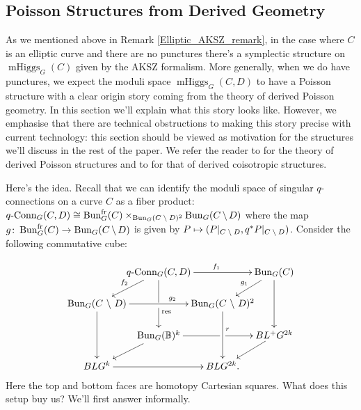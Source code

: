 \documentclass[10pt, oneside]{article}
\DeclareMathOperator{\mhiggs}{mHiggs}
\newcommand{\qconn}{q\text{-Conn}}
\newcommand{\fr}{\mathrm{fr}}
\begin{document}
\subsection{Poisson Structures from Derived Geometry}
As we mentioned above in Remark \ref{Elliptic_AKSZ_remark}, in the case where $C$ is an elliptic curve and there are no punctures there's a symplectic structure on $\mhiggs_G(C)$ given by the AKSZ formalism.  More generally, when we do have punctures, we expect the moduli space $\mhiggs_G(C,D)$ to have a Poisson structure with a clear origin story coming from the theory of derived Poisson geometry.  In this section we'll explain what this story looks like.  However, we emphasise that there are technical obstructions to making this story precise with current technology: this section should be viewed as motivation for the structures we'll discuss in the rest of the paper.  We refer the reader to \cite{CPTVV} for the theory of derived Poisson structures and to \cite{MelaniSafronov1, MelaniSafronov2, Spaide} for that of derived coisotropic structures.

Here's the idea.  Recall that we can identify the moduli space of singular $q$-connections on a curve $C$ as a fiber product: $\qconn_G(C, D) \iso \bun_G^\fr(C) \times_{\bun_G(C \! \bs \! D)^2} \bun_G(C \! \bs \! D)$ where the map $g \colon \bun_G^\fr(C) \to \bun_G(C \! \bs \! D)$ is given by $P \mapsto (P|_{C \! \ \backslash \  \! D}, q^*P|_{C \! \ \backslash \  \! D})$.  Consider the following commutative cube:

\[\xymatrix@C-30pt@R-8pt{
& \qconn_G(C, D) \ar[rr]^{f_1} \ar'[d][dd]^(.25){\mr{res}} & & \bun_G(C) \ar[dd]
\\
\bun_G(C \bs D) \ar@{<-}[ur]^{f_2} \ar[rr]^(.6){g_2} \ar[dd] & & \bun_G(C \bs D)^2 \ar@{<-}[ur]^{g_1} \ar[dd]^(.4)r
\\
& \bun_G(\bb B)^k \ar'[r][rr] & & BL^+G^{2k}
\\
BLG^k \ar[rr]\ar@{<-}[ur] & & BLG^{2k}. \ar@{<-}[ur]
}\]
Here the top and bottom faces are homotopy Cartesian squares.  What does this setup buy us?  We'll first answer informally.
\end{document}
